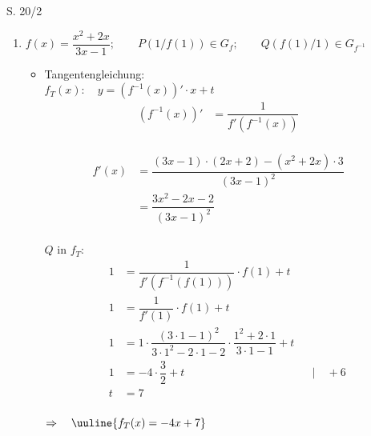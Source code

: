 \begin{Exercise}{S. 20/2}{}
\begin{enumerate}
\begin{enumerate}[label=\alph*)]
{\begin{itemize}[leftmargin=*]
{                        }
                \end{itemize}
                }
            \item[c)] {
                $f(x) = \dfrac{x^2 + 2x}{3x -1}; \qquad P(1/f(1)) \in G_{f}; \qquad Q(f(1)/1) \in G_{f^{-1}}$\\[-2.0ex]
                \begin{itemize}[leftmargin=*]
                    \item Tangentengleichung: \\[2.0ex]{
                        $f_{T}(x): \quad y = \left(f^{-1}(x)\right)' \cdot x + t$\\
                        \vspace{-2.0ex}
                        \begin{align*}
                            \left(f^{-1}(x)\right)' &= \dfrac{1}{f'\left(f^{-1}(x)\right)} &&
                        \end{align*}\\[-2.0ex]
                        \begin{align*}
                            f'(x) &= \dfrac{\left(3x - 1\right) \cdot \left(2x + 2\right) - \left(x^2 + 2x\right) \cdot 3}{\left(3x - 1\right)^{2}} && \\[1.5ex]
                            &= \dfrac{3x^2 - 2x -2}{\left(3x - 1\right)^{2}} &&
                        \end{align*}\\[-2.0ex]
                        $Q$ in $f_{T}$: \\[-2.0ex]
                        \begin{align*}
                            1 &= \dfrac{1}{f'\left(f^{-1}(f(1))\right)} \cdot f(1) + t &&\\[1.5ex]
                            1 &= \dfrac{1}{f'(1)} \cdot f(1) + t &&\\[1.5ex]
                            1 &= 1 \cdot \dfrac{\left(3 \cdot 1 - 1\right)^{2}}{3 \cdot {1}^2 - 2 \cdot 1 -2} \cdot \dfrac{1^2 + 2 \cdot 1}{3 \cdot 1 -1} + t &&\\[1.5ex]
                            1 &= -4 \cdot \dfrac{3}{2} + t &&| \quad + 6\\[1.5ex]
                            t &= 7 &&
                        \end{align*}\\[-2.0ex]
                        $\Rightarrow \quad \uuline{f_{T}(x) = -4x + 7}$\\
                        }

\end{itemize}}
\end{enumerate}
\end{enumerate}
\end{Exercise}
